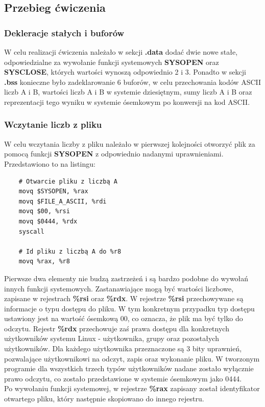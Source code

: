 \documentclass[a4paper,12pt]{article}
\begin{document}
\subsection{Przebieg ćwiczenia}
\subsubsection{Dekleracje stałych i buforów}
W celu realizacji ćwiczenia należało w sekcji \textbf{.data} dodać dwie nowe stałe, odpowiedzialne za wywołanie funkcji systemowych \textbf{SYSOPEN} oraz \textbf{SYSCLOSE}, których wartości wynoszą odpowiednio 2 i 3. Ponadto w sekcji \textbf{.bss} konieczne było zadeklarowanie 6 buforów, w celu przechowania kodów ASCII liczb A i B, wartości liczb A i B w systemie dziesiętnym, sumy liczb A i B oraz reprezentacji tego wyniku w systemie ósemkowym po konwersji na kod ASCII.
\subsubsection{Wczytanie liczb z pliku}
W celu wczytania liczby z pliku należało w pierwszej kolejności otworzyć plik za pomocą funkcji \textbf{SYSOPEN} z odpowiednio nadanymi uprawnieniami. Przedstawiono to na listingu:
\begin{verbatim}
	# Otwarcie pliku z liczbą A
	movq $SYSOPEN, %rax
	movq $FILE_A_ASCII, %rdi
	movq $00, %rsi
	movq $0444, %rdx
	syscall
	
	# Id pliku z liczbą A do %r8
	movq %rax, %r8
\end{verbatim}
Pierwsze dwa elementy nie budzą zastrzeżeń i są bardzo podobne do wywołań innych funkcji systemowych. Zastanawiające mogą być wartości liczbowe, zapisane w rejestrach \textbf{\%rsi} oraz \textbf{\%rdx}. W rejestrze \textbf{\%rsi} przechowywane są informacje o typu dostępu do pliku. W tym konkretnym przypadku typ dostępu ustawiony jest na wartość ósemkową 00, co oznacza, że plik ma być tylko do odczytu. Rejestr \textbf{\%rdx} przechowuje zaś prawa dostępu dla konkretnych użytkowników systemu Linux - użytkownika, grupy oraz pozostałych użytkowników. Dla każdego użytkownika przeznaczone są 3 bity uprawnień, pozwalające użytkownikowi na odczyt, zapis oraz wykonanie pliku. W tworzonym programie dla wszystkich trzech typów użytkowników nadane zostało wyłącznie prawo odczytu, co zostało przedstawione w systemie ósemkowym jako 0444.\\
Po wywołaniu funkcji systemowej, w rejestrze \textbf{\%rax} zapisany został identyfikator otwartego pliku, który następnie skopiowano do innego rejestru.
\end{document}
